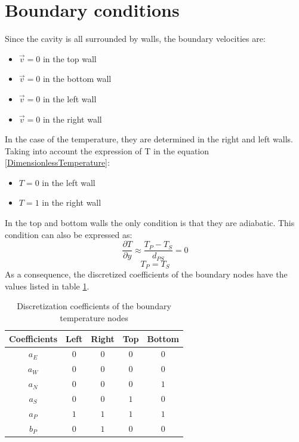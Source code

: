 \section{Boundary conditions}
Since the cavity is all surrounded by walls, the boundary velocities are:
\begin{itemize}
	\item $\vec{v}=0$ in the top wall
	\item $\vec{v}=0$ in the bottom wall
	\item $\vec{v}=0$ in the left wall
	\item $\vec{v}=0$ in the right wall
\end{itemize}
In the case of the temperature, they are determined in the right and left walls. Taking into account the expression of T in the equation \ref{DimensionlessTemperature}:
\begin{itemize}
	\item $T=0$ in the left wall
	\item $T=1$ in the right wall
\end{itemize}
In the top and bottom walls the only condition is that they are adiabatic. This condition can also be expressed as:
\begin{equation}
\frac{\partial T}{\partial y}\approx\frac{T_{P}-T_{S}}{d_{PS}}=0
\end{equation}
\begin{equation}
T_{P}=T_{S}
\end{equation}
As a consequence, the discretized coefficients of the boundary nodes have the values listed in table \ref{BoundTempDiffHeat}.
\begin{table}[h]
	\centering\begin{tabular}{ |c|c|c|c|c| }
		\hline
		Coefficients & Left & Right & Top & Bottom \\ \hline
		$a_{E}$ & $0$ & $0$ & $0$ & $0$ \\ \hline
		$a_{W}$ & $0$ & $0$ & $0$ & $0$ \\ \hline
		$a_{N}$ & $0$ & $0$ & $0$ & $1$ \\ \hline
		$a_{S}$ & $0$ & $0$ & $1$ & $0$ \\ \hline
		$a_{P}$ & $1$ & $1$ & $1$ & $1$ \\ \hline
		$b_{P}$ & $0$ & $1$ & $0$ & $0$ \\ \hline
	\end{tabular}
\caption{Discretization coefficients of the boundary temperature nodes}
\label{BoundTempDiffHeat}
\end{table}